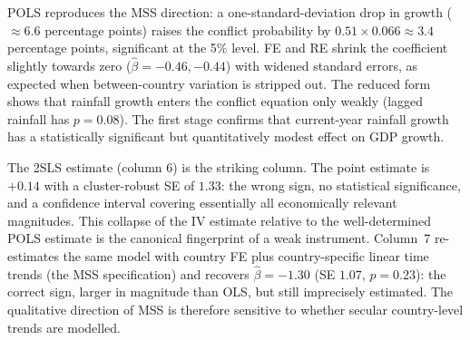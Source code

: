 \documentclass[11pt,a4paper]{article}
\begin{document}
POLS reproduces the MSS direction: a one-standard-deviation drop in
growth ($\approx 6.6$ percentage points) raises the conflict
probability by $0.51 \times 0.066 \approx 3.4$ percentage points,
significant at the 5\% level. FE and RE shrink the coefficient slightly
towards zero ($\hat\beta = -0.46, -0.44$) with widened standard errors,
as expected when between-country variation is stripped out. The reduced
form shows that rainfall growth enters the conflict equation only
weakly (lagged rainfall has $p = 0.08$). The first stage confirms that
current-year rainfall growth has a statistically significant but
quantitatively modest effect on GDP growth.

The 2SLS estimate (column 6) is the striking column. The point estimate
is $+0.14$ with a cluster-robust SE of $1.33$: the wrong sign, no
statistical significance, and a confidence interval covering essentially
all economically relevant magnitudes. This collapse of the IV estimate
relative to the well-determined POLS estimate is the canonical
fingerprint of a weak instrument. Column~7 re-estimates the same model
with country FE plus country-specific linear time trends (the MSS
specification) and recovers $\hat\beta = -1.30$ (SE $1.07$, $p = 0.23$):
the correct sign, larger in magnitude than OLS, but still imprecisely
estimated. The qualitative direction of MSS is therefore sensitive to
whether secular country-level trends are modelled.
\end{document}
